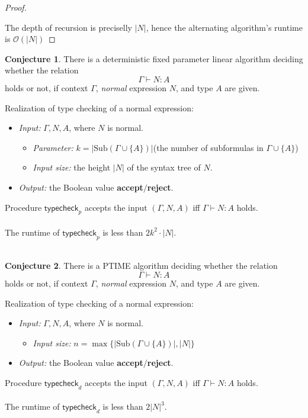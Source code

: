\documentclass[12pt, titlepage, a4paper]{amsart}
\theoremstyle{definition}
\newtheorem{conjecture}{Conjecture}
\theoremstyle{theorem}
\theoremstyle{remark}
\begin{document}
\begin{proof}
\begin{center}
{{\begin{minipage}{.8\textwidth}
\end{minipage}
}}

\end{center}The depth of recursion is preciselly $|N|$, hence the alternating algorithm's runtime is  $\boxed{\mathcal{O}(|N|)}$
\end{proof}
\begin{conjecture}  There is a deterministic fixed parameter linear algorithm deciding whether the relation 
$$\Gamma\vdash N:A$$ 
holds or not, if context $\Gamma$, \textit{normal} expression $N$, and type $A$ are given.
\end{conjecture}$ $\\
\noindent Realization of type checking of a normal expression:
\begin{itemize}
\item[] \textit{Input:} $\Gamma, N, A$, where $N$ is normal.
\begin{itemize}
\item[] \textit{Parameter:} $k=|\mathrm{Sub}(\Gamma\cup \{A\})|$\quad (the number of subformulas in $\Gamma\cup \{A\}$)
\item[] \textit{Input size:} the height $|N|$ of the syntax tree of $N$.
\end{itemize}
\item[] \textit{Output:} the Boolean value \textbf{accept}$\slash$\textbf{reject}. 
\end{itemize}
Procedure $\mathsf{typecheck}_p$ accepts the input $(\Gamma,N,A)$ iff $\Gamma\vdash N:A$ holds.\\\\
The runtime of $\mathsf{typecheck}_p$ is less than $\boxed{2k^2\cdot |N|}$.\\\\
\begin{conjecture} There is a PTIME algorithm deciding whether the relation 
$$\Gamma\vdash N:A$$ 
holds or not, if context $\Gamma$, \textit{normal} expression $N$, and type $A$ are given.
\end{conjecture}$ $\\
\noindent Realization of type checking of a normal expression:
\begin{itemize}
\item[] \textit{Input:} $\Gamma, N, A$, where $N$ is normal.
\begin{itemize} 
\item[] \textit{Input size:} $n=\max\{|\mathrm{Sub}(\Gamma\cup \{A\})|,|N|\}$
\end{itemize}
\item[] \textit{Output:} the Boolean value \textbf{accept}$\slash$\textbf{reject}. 
\end{itemize}
Procedure $\mathsf{typecheck}_d$ accepts the input $(\Gamma,N,A)$ iff $\Gamma\vdash N:A$ holds.\\\\
The runtime of $\mathsf{typecheck}_d$ is less than $\boxed{2|N|^3}$.
\end{document}
